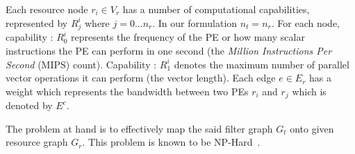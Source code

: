 \documentclass[10pt, conference, compsocconf]{IEEEtran}
\begin{document}


Each resource node $r_i \in V_r$ has a number of computational
capabilities, represented by $R^{i}_{j}$ where $j=0...n_r$.
In our formulation $n_t = n_r$.
For each node, capability : $R^i_0$ represents the frequency of the PE or how many
scalar instructions the PE can perform in one second (the
\textit{Million Instructions Per Second} (MIPS) count). Capability : $R^i_1$
denotes the maximum number of parallel vector operations it
can perform (the vector length). Each edge $e \in E_r$ has a weight
which represents the bandwidth between two PEs $r_i$ and $r_j$ which is
denoted by $E^c$.


The problem at hand is to effectively map the said filter graph $G_t$ onto
given resource graph $G_r$. This problem is known to be
NP-Hard~\cite{vsar89}. %

\end{document}
